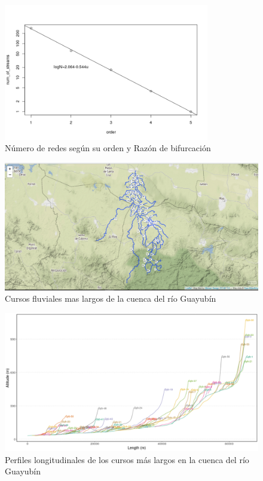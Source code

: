 \documentclass[11pt,]{article}
\begin{document}
\begin{figure}
\centering
\includegraphics[width=0.80000\textwidth]{Numero de red segun su orden.png}
\caption{Número de redes según su orden y Razón de
bifurcación\label{grafnumero}}
\end{figure}

\begin{figure}
\centering
\includegraphics[width=1.00000\textwidth]{cursos mas largos.png}
\caption{Cursos fluviales mas largos de la cuenca del río
Guayubín\label{lfpnet}}
\end{figure}

\begin{figure}
\centering
\includegraphics[width=1.00000\textwidth]{perfiles longitudinales.png}
\caption{Perfiles longitudinales de los cursos más largos en la cuenca
del río Guayubín\label{plongitudinal}}
\end{figure}
\end{document}
